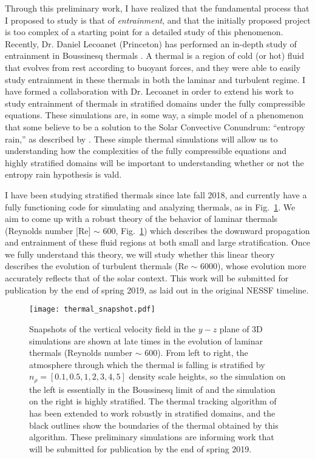 \documentclass[aasms,12pt]{article}
\begin{document}
Through this preliminary work, I have realized that the fundamental process that I proposed
to study is that of \emph{entrainment}, and that the initially proposed project is too complex
of a starting point for a detailed study of this phenomenon. 
Recently, Dr. Daniel Lecoanet (Princeton) has performed an in-depth study of entrainment 
in Boussinesq thermals \citep[][in review]{lecoanet&jeevanjee2018}. A thermal is a region of
cold (or hot) fluid that evolves from rest according to buoyant forces, and they were able to
easily study entrainment in these thermals in both the laminar and turbulent regime.
I have formed a collaboration with Dr. Lecoanet in order to extend his work to study 
entrainment of thermals in stratified domains under the fully compressible equations.
These simulations are, in some way, a simple model of a phenomenon that some believe to be
a solution to the Solar Convective Conundrum: ``entropy rain,'' as described by
\citet{brandenburg2016}. These simple thermal simulations will allow us to
understanding how the complexities of the fully compressible equations
and highly stratified domains will be important to understanding whether or not the entropy
rain hypothesis is vald.

\newpage
I have been studying stratified thermals since late fall 2018, and currently have a
fully functioning code for simulating and analyzing thermals, as in Fig.~\ref{fig:thermals}.
We aim to come up with a robust theory of the behavior of laminar thermals 
(Reynolds number [Re] $\sim$ 600, Fig.~\ref{fig:thermals})
which describes the downward propagation and entrainment of these fluid regions 
at both small and large stratification. Once we fully understand this theory, we will
study whether this linear theory describes the evolution of turbulent thermals (Re $\sim$ 6000),
whose evolution more accurately reflects that of the solar context. This work will be
submitted for publication by the end of spring 2019, as laid out in the original NESSF timeline.

\begin{figure}[t]
\centering
\texttt{[image: thermal\_snapshot.pdf]}
\caption{Snapshots of the vertical velocity field in the $y-z$ plane of 3D simulations are shown
at late times in the evolution of laminar thermals (Reynolds number $\sim$ 600).
From left to right, the atmosphere through
which the thermal is falling is stratified by $n_\rho = [0.1, 0.5, 1, 2, 3, 4, 5]$ density
scale heights, so the simulation on the left is essentially in the Boussinesq limit of
\citet{lecoanet&jeevanjee2018} and the simulation on the right is highly stratified. The thermal
tracking algorithm of \citet{lecoanet&jeevanjee2018} has been extended to work robustly in 
stratified domains, and the black outlines show the boundaries of the thermal obtained by
this algorithm. These preliminary simulations are informing work that will be submitted for
publication by the end of spring 2019.
\label{fig:thermals}}
\end{figure}
\end{document}
